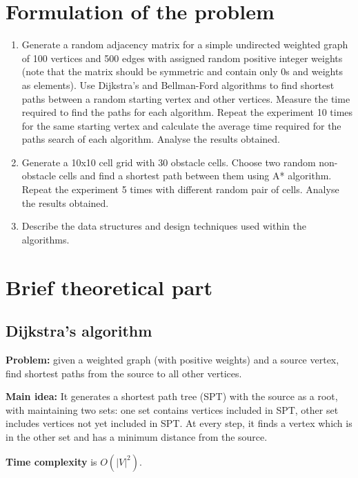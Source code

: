 \documentclass[a4paper,article,14pt]{extarticle}
\begin{document}
	\section{Formulation of the problem}
	\begin{enumerate}[label=\Roman*]
		\item Generate a random adjacency matrix for a simple undirected weighted graph of 100 vertices and 500 edges with assigned random positive integer weights (note that the matrix should be symmetric and contain only 0s and weights as elements). Use Dijkstra's and Bellman-Ford algorithms to find shortest paths between a random starting vertex and other vertices. Measure the time required to find the paths for each algorithm. Repeat the experiment 10 times for the same starting vertex and calculate the average time required for the paths search of each algorithm. Analyse the results obtained.
		\item Generate a 10x10 cell grid with 30 obstacle cells. Choose two random non-obstacle cells and find a shortest path between them using A* algorithm. Repeat the experiment 5 times with different random pair of cells. Analyse the results obtained.
		\item Describe the data structures and design techniques used within the algorithms.
	\end{enumerate}
	
	\section{Brief theoretical part}
	\subsection{Dijkstra's algorithm}
	\textbf{Problem:} given a weighted graph (with positive weights) and a source vertex, find shortest paths from the source to all other vertices.
	
	\textbf{Main idea:} It generates a shortest path tree (SPT) with the source as a root, with maintaining two sets: one set contains vertices included in SPT, other set includes vertices not yet included in SPT. At every step, it finds a vertex which is in the other set and has a minimum distance from the source.
	
	\textbf{Time complexity} is $O(|V|^2)$.
	
\end{document}
